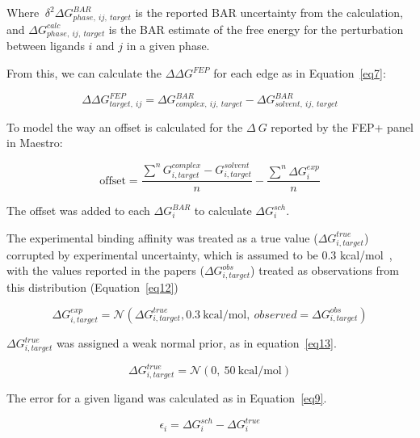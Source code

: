 \documentclass[9pt,lineno]{elife-modified} %
\begin{document}
 Where $~\delta^2\Delta G^{BAR}_{phase, ~ij, ~target}$ is the reported BAR uncertainty from the calculation, and $\Delta G^{calc}_{phase,~ij,~target}$ is the BAR estimate of the free energy for the perturbation between ligands $i$ and $j$ in a given phase. 
 
 From this, we can calculate the $\Delta \Delta G^{FEP}$ for each edge as in Equation~\ref{eq7}:
 
 \begin{equation}\label{eq7}
 \Delta\Delta G^{FEP}_{target,~ij} = \Delta G^{BAR}_{complex,~ij,~target} - \Delta G^{BAR}_{solvent,~ij,~target}
 \end{equation}
 
 To model the way an offset is calculated for the $\Delta~G$ reported by the FEP+ panel in Maestro: 
 
\begin{equation}\label{eq8}
\text{offset} =  \frac{\sum^n G^{complex}_{i,target} - G^{solvent}_{i,target}}{n} - \frac{\sum^n \Delta G^{exp}_{i}}{n}
\end{equation}

The offset was added to each $\Delta G^{BAR}_{i}$ to calculate $\Delta G^{sch}_{i}$. 

The experimental binding affinity was treated as a true value ($\Delta G^{true}_{i,target}$) corrupted by experimental uncertainty, which is assumed to be 0.3 kcal/mol~\citep{BROWN2009420}, with the values reported in the papers ($\Delta G^{obs}_{i,target}$) treated as observations from this distribution (Equation~\ref{eq12}) 

\begin{equation}\label{eq12}
\Delta G^{exp}_{i,target} = \mathcal{N}(\Delta G^{true}_{i,target}, 0.3 ~\text{kcal/mol},~observed = \Delta G^{obs}_{i,target})
\end{equation}

$\Delta G^{true}_{i,target}$ was assigned a weak normal prior, as in equation~\ref{eq13}. 

\begin{equation}\label{eq13}
\Delta G^{true}_{i,target} = \mathcal{N}(0, ~50~\text{kcal/mol})
\end{equation}

The error for a given ligand was calculated as in Equation~\ref{eq9}. 

\begin{equation}\label{eq9}
\epsilon_i = \Delta G^{sch}_i - \Delta G^{true}_i
\end{equation}
\end{document}
